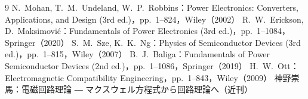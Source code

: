 \begin{thebibliography}{9}
 N.~Mohan, T.~M.~Undeland, W.~P.~Robbins：Power Electronics: Converters, Applications, and Design (3rd ed.)，pp.~1--824，Wiley（2002）
 R.~W.~Erickson, D.~Maksimovi\'{c}：Fundamentals of Power Electronics (3rd ed.)，pp.~1--1084，Springer（2020）
 S.~M.~Sze, K.~K.~Ng：Physics of Semiconductor Devices (3rd ed.)，pp.~1--815，Wiley（2007）
 B.~J.~Baliga：Fundamentals of Power Semiconductor Devices (2nd ed.)，pp.~1--1086，Springer（2019）
 H.~W.~Ott：Electromagnetic Compatibility Engineering，pp.~1--843，Wiley（2009）
 神野崇馬：電磁回路理論 ― マクスウェル方程式から回路理論へ（近刊）
\end{thebibliography}
